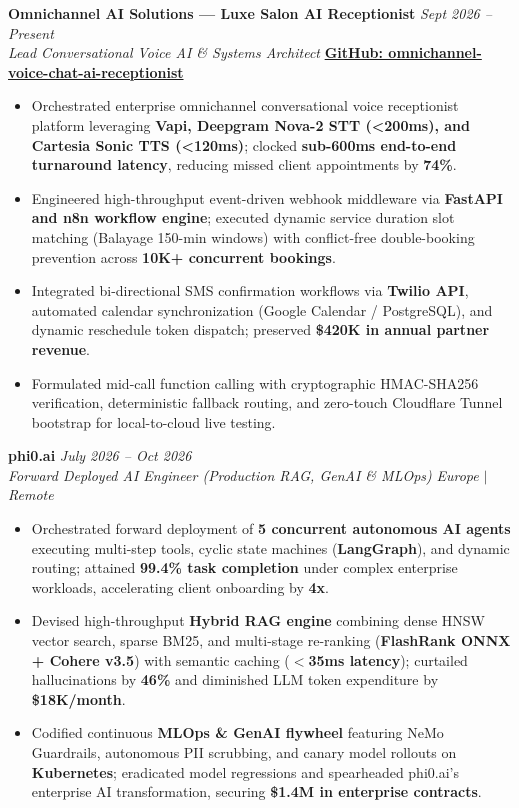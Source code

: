 \documentclass[9.5pt,a4paper]{article}
\begin{document}
\noindent\textbf{Omnichannel AI Solutions --- Luxe Salon AI Receptionist} \hfill {\small\textit{Sept 2026 -- Present}}\\
\textit{Lead Conversational Voice AI \& Systems Architect} \hfill {\footnotesize\href{https://github.com/KishorKumarParoi/omnichannel-voice-chat-ai-receptionist}{\textbf{GitHub: omnichannel-voice-chat-ai-receptionist}}}
\begin{itemize}
    \item Orchestrated enterprise omnichannel conversational voice receptionist platform leveraging \textbf{Vapi, Deepgram Nova-2 STT (<200ms), and Cartesia Sonic TTS (<120ms)}; clocked \textbf{sub-600ms end-to-end turnaround latency}, reducing missed client appointments by \textbf{74\%}.
    \item Engineered high-throughput event-driven webhook middleware via \textbf{FastAPI and n8n workflow engine}; executed dynamic service duration slot matching (Balayage 150-min windows) with conflict-free double-booking prevention across \textbf{10K+ concurrent bookings}.
    \item Integrated bi-directional SMS confirmation workflows via \textbf{Twilio API}, automated calendar synchronization (Google Calendar / PostgreSQL), and dynamic reschedule token dispatch; preserved \textbf{\$420K in annual partner revenue}.
    \item Formulated mid-call function calling with cryptographic HMAC-SHA256 verification, deterministic fallback routing, and zero-touch Cloudflare Tunnel bootstrap for local-to-cloud live testing.
\end{itemize}

\vspace{2.0pt}
\noindent\textbf{phi0.ai} \hfill {\small\textit{July 2026 -- Oct 2026}}\\
\textit{Forward Deployed AI Engineer (Production RAG, GenAI \& MLOps)} \hfill {\footnotesize\textit{Europe $\vert$ Remote}}
\begin{itemize}
    \item Orchestrated forward deployment of \textbf{5 concurrent autonomous AI agents} executing multi-step tools, cyclic state machines (\textbf{LangGraph}), and dynamic routing; attained \textbf{99.4\% task completion} under complex enterprise workloads, accelerating client onboarding by \textbf{4x}.
    \item Devised high-throughput \textbf{Hybrid RAG engine} combining dense HNSW vector search, sparse BM25, and multi-stage re-ranking (\textbf{FlashRank ONNX + Cohere v3.5}) with semantic caching (\textbf{$<$35ms latency}); curtailed hallucinations by \textbf{46\%} and diminished LLM token expenditure by \textbf{\$18K/month}.
    \item Codified continuous \textbf{MLOps \& GenAI flywheel} featuring NeMo Guardrails, autonomous PII scrubbing, and canary model rollouts on \textbf{Kubernetes}; eradicated model regressions and spearheaded phi0.ai's enterprise AI transformation, securing \textbf{\$1.4M in enterprise contracts}.
\end{itemize}
\end{document}
